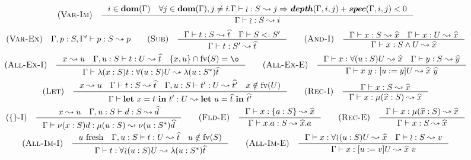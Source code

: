 \begin{minipage}{\textwidth} \[\begin{array}{c}
    \RULE{Var-Im} \quad \inference{
        i \in \DOM{\Gamma} \quad
        \forall j \in \DOM{\Gamma}, j \neq i.
            \TJ{\Gamma}{\IMP}{S}{j} \Rightarrow
            \DEPTH{\Gamma, i, j} + \SPEC{\Gamma, i, j} < 0
    }{
        \TJ{\Gamma}{\IMP}{S}{i}
    } \\[4mm]

    \RULE{Var-Ex} \quad \TJ{\Gamma, p: S, \Gamma'}{p}{S}{p} \qquad

    \RULE{Sub} \quad \inference{
        \TJ{\Gamma}{t}{S}{\HAT{t}} \quad
        \SJ{\Gamma}{S}{S'}
    }{
        \TJ{\Gamma}{t}{S'}{\HAT{t}}
    } \qquad

    \RULE{And-I} \quad \inference{
        \TJ{\Gamma}{x}{S}{\HAT{x}} \quad
        \TJ{\Gamma}{x}{U}{\HAT{x}}
    }{
        \TJ{\Gamma}{x}{\AGG{S}{U}}{\HAT{x}}
    } \\[4mm]

    \RULE{All-Ex-I} \quad \inference{
        x \leadsto u \quad
        \TJ{\Gamma, u: S}{t}{U}{\HAT{t}} \quad
        \{x, u\} \cap \FV{S} = \o
    }{
        \TJ{\Gamma}{\ABS{x}{S}{t}}{\DFUN{u}{S}{U}}{\ABS{u}{\TRANS{S}}{\HAT{t}}}
    } \qquad

    \RULE{All-Ex-E} \quad \inference{
        \TJ{\Gamma}{x}{\DFUN{u}{S}{U}}{\HAT{x}} \quad
        \TJ{\Gamma}{y}{S}{\HAT{y}}
    }{
        \TJ{\Gamma}{x\ y}{\SUB{u}{y}U}{\HAT{x}\ \HAT{y}}
    } \\[4mm]

    \RULE{Let} \quad \inference{
        x \leadsto u \quad
        \TJ{\Gamma}{t}{S}{\HAT{t}} \quad
        \TJ{\Gamma, u: S}{t'}{U}{\HAT{t'}} \quad
        x \notin \FV{U}
    }{
        \TJ{\Gamma}{\LET{x}{t}{t'}}{U}{\LET{u}{\HAT{t}}{\HAT{t'}}}
    } \qquad

    \RULE{Rec-I} \quad \inference{
        \TJ{\Gamma}{x}{S}{\HAT{x}}
    }{
        \TJ{\Gamma}{x}{\REC{\HAT{x}}{S}}{\HAT{x}}
    } \\[4mm]

    \RULE{\{\}-I} \quad \inference{
        x \leadsto u \quad
        \TJ{\Gamma, u: S}{d}{S}{\HAT{d}}
    }{
        \TJ{\Gamma}{\OBJ{x}{S}{d}}{\REC{u}{S}}{\OBJ{u}{\TRANS{S}}{\HAT{d}}}
    } \qquad

    \RULE{Fld-E} \quad \inference{
        \TJ{\Gamma}{x}{\FDEC{a}{S}}{\HAT{x}}
    }{
        \TJ{\Gamma}{x.a}{S}{\HAT{x}.a}
    } \qquad

    \RULE{Rec-E} \quad \inference{
        \TJ{\Gamma}{x}{\REC{\HAT{x}}{S}}{\HAT{x}}
    }{
        \TJ{\Gamma}{x}{S}{\HAT{x}}
    } \\[4mm]

    \RULE{All-Im-I} \quad \inference{
        u\ \text{fresh} \quad
        \TJ{\Gamma, u: S}{t}{U}{\HAT{t}} \quad
        u \notin \FV{S}
    }{
        \TJ{\Gamma}{t}{\IFUN{u}{S}{U}}{\ABS{u}{\TRANS{S}}{\HAT{t}}}
    } \qquad

    \RULE{All-Im-E} \quad \inference{
        \TJ{\Gamma}{x}{\IFUN{u}{S}{U}}{\HAT{x}} \quad
        \TJ{\Gamma}{\IMP}{S}{v}
    }{
        \TJ{\Gamma}{x}{\SUB{u}{v}U}{\HAT{x}\ v}
    }
\end{array}\] \end{minipage}
